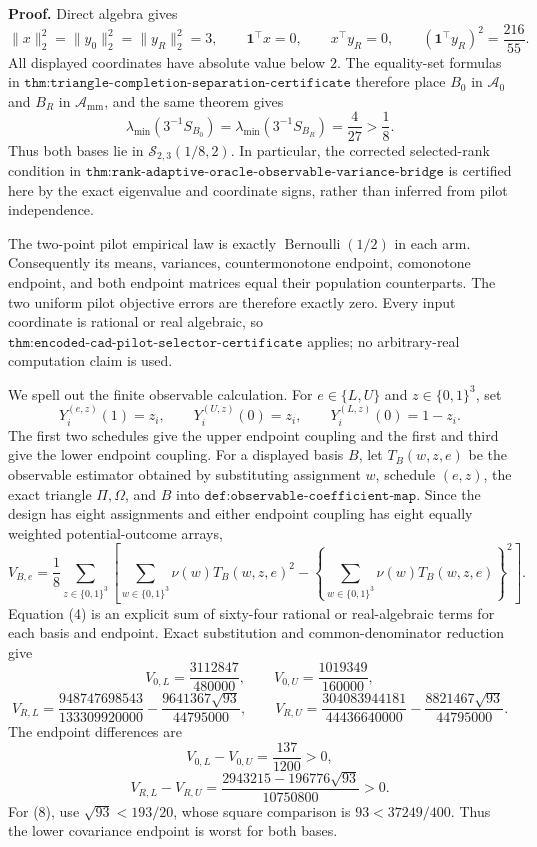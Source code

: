 \textbf{Proof.}
Direct algebra gives
\[
\lVert x\rVert_2^2=\lVert y_0\rVert_2^2
=\lVert y_R\rVert_2^2=3,
\qquad
\mathbf1^{\top}x=0,
\qquad
x^{\top}y_R=0,
\qquad
(\mathbf1^{\top}y_R)^2=\frac{216}{55}.
\tag{1}
\]
All displayed coordinates have absolute value below \(2\).  The equality-set formulas in \(\texttt{thm:triangle-completion-separation-certificate}\) therefore place \(B_0\) in \(\mathcal A_0\) and \(B_R\) in \(\mathcal A_{\mathrm{mm}}\), and the same theorem gives
\[
\lambda_{\min}(3^{-1}S_{B_0})
=\lambda_{\min}(3^{-1}S_{B_R})=\frac4{27}>\frac18.
\tag{2}
\]
Thus both bases lie in \(\mathcal S_{2,3}(1/8,2)\).  In particular, the corrected selected-rank condition in \(\texttt{thm:rank-adaptive-oracle-observable-variance-bridge}\) is certified here by the exact eigenvalue and coordinate signs, rather than inferred from pilot independence.

The two-point pilot empirical law is exactly \(\operatorname{Bernoulli}(1/2)\) in each arm.  Consequently its means, variances, countermonotone endpoint, comonotone endpoint, and both endpoint matrices equal their population counterparts.  The two uniform pilot objective errors are therefore exactly zero.  Every input coordinate is rational or real algebraic, so \(\texttt{thm:encoded-cad-pilot-selector-certificate}\) applies; no arbitrary-real computation claim is used.

We spell out the finite observable calculation.  For \(e\in\{L,U\}\) and \(z\in\{0,1\}^3\), set
\[
Y_i^{(e,z)}(1)=z_i,
\qquad
Y_i^{(U,z)}(0)=z_i,
\qquad
Y_i^{(L,z)}(0)=1-z_i.
\tag{3}
\]
The first two schedules give the upper endpoint coupling and the first and third give the lower endpoint coupling.  For a displayed basis \(B\), let \(T_B(w,z,e)\) be the observable estimator obtained by substituting assignment \(w\), schedule \((e,z)\), the exact triangle \(\Pi,\Omega\), and \(B\) into \(\texttt{def:observable-coefficient-map}\).  Since the design has eight assignments and either endpoint coupling has eight equally weighted potential-outcome arrays,
\[
V_{B,e}
=\frac18\sum_{z\in\{0,1\}^3}
\left[
\sum_{w\in\{0,1\}^3}\nu(w)T_B(w,z,e)^2
-\left\{\sum_{w\in\{0,1\}^3}\nu(w)T_B(w,z,e)\right\}^2
\right].
\tag{4}
\]
Equation (4) is an explicit sum of sixty-four rational or real-algebraic terms for each basis and endpoint.  Exact substitution and common-denominator reduction give
\[
V_{0,L}=\frac{3112847}{480000},
\qquad
V_{0,U}=\frac{1019349}{160000},
\tag{5}
\]
\[
V_{R,L}
=\frac{948747698543}{133309920000}
-\frac{9641367\sqrt{93}}{44795000},
\qquad
V_{R,U}
=\frac{304083944181}{44436640000}
-\frac{8821467\sqrt{93}}{44795000}.
\tag{6}
\]
The endpoint differences are
\[
V_{0,L}-V_{0,U}=\frac{137}{1200}>0,
\tag{7}
\]
\[
V_{R,L}-V_{R,U}
=\frac{2943215-196776\sqrt{93}}{10750800}>0.
\tag{8}
\]
For (8), use \(\sqrt{93}<193/20\), whose square comparison is \(93<37249/400\).  Thus the lower covariance endpoint is worst for both bases.

